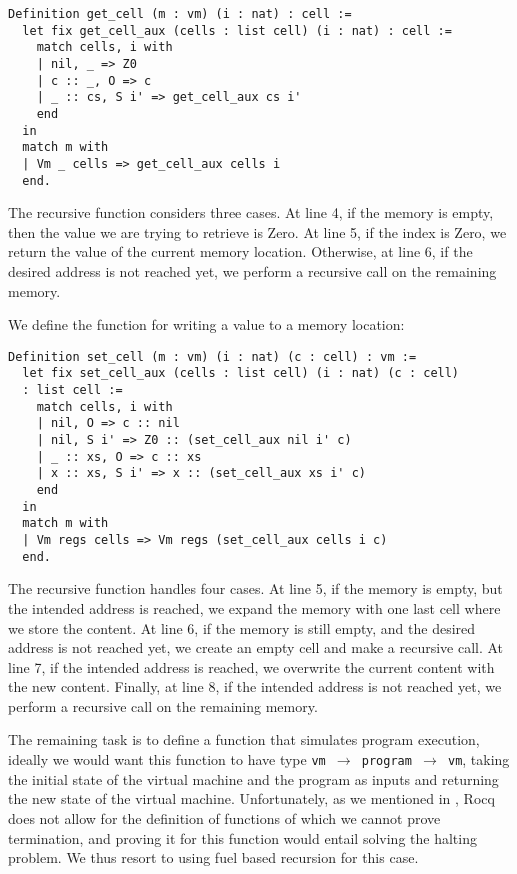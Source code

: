 \begin{lstlisting}[style=Rocq]
Definition get_cell (m : vm) (i : nat) : cell :=
  let fix get_cell_aux (cells : list cell) (i : nat) : cell :=
    match cells, i with
    | nil, _ => Z0
    | c :: _, O => c
    | _ :: cs, S i' => get_cell_aux cs i'
    end
  in
  match m with
  | Vm _ cells => get_cell_aux cells i
  end.
\end{lstlisting}

The recursive function considers three cases. At line 4,  if the memory is empty, then the value we are trying to retrieve is Zero.  At line 5, if the index is Zero, we return the value of the current memory location. Otherwise, at line 6, if the desired address is not reached yet, we perform a recursive call on the remaining memory.

We define the function for writing a value to a memory location:

\begin{lstlisting}[style=Rocq]
Definition set_cell (m : vm) (i : nat) (c : cell) : vm :=
  let fix set_cell_aux (cells : list cell) (i : nat) (c : cell)
  : list cell :=
    match cells, i with
    | nil, O => c :: nil
    | nil, S i' => Z0 :: (set_cell_aux nil i' c)
    | _ :: xs, O => c :: xs
    | x :: xs, S i' => x :: (set_cell_aux xs i' c)
    end
  in
  match m with
  | Vm regs cells => Vm regs (set_cell_aux cells i c)
  end.
\end{lstlisting}

The recursive function handles four cases.  At line 5, if the memory is empty, but the intended address is reached, we expand the memory with one last cell where we store the content. At line 6, if the memory is still empty, and the desired address is not reached yet, we create an empty cell and make a recursive call. At line 7, if the intended address is reached, we overwrite the current content with the new content. Finally, at line 8, if the intended address is not reached yet, we perform a recursive call on the remaining memory.

The remaining task is to define a function that simulates program execution, ideally we would want this function to have type \texttt{vm $\to$ program $\to$ vm}, taking the initial state of the virtual machine and the program as inputs and returning the new state of the virtual machine.
Unfortunately, as we mentioned in , Rocq does not allow for the definition of functions of which we cannot prove termination, and proving it for this function would entail solving the halting problem. We thus resort to using fuel based recursion for this case.

